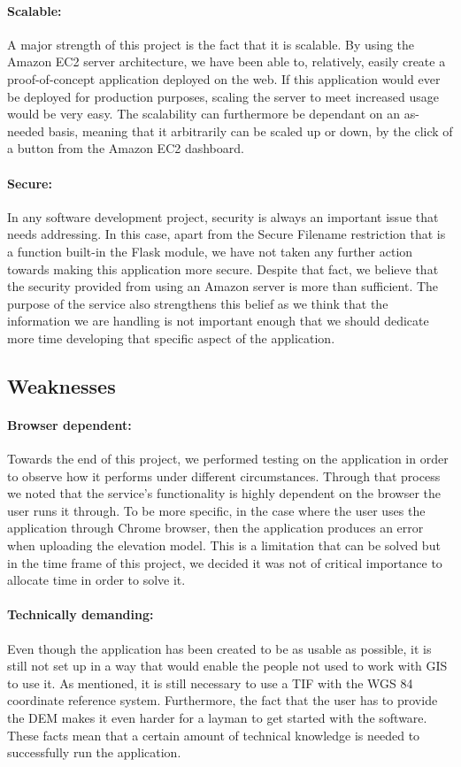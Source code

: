 \paragraph{Scalable:} A major strength of this project is the fact that it is scalable. By using the Amazon EC2 server architecture, we have been able to, relatively, easily create a proof-of-concept application deployed on the web. If this application would ever be deployed for production purposes, scaling the server to meet increased usage would be very easy. The scalability can furthermore be dependant on an as-needed basis, meaning that it arbitrarily can be scaled up or down, by the click of a button from the Amazon EC2 dashboard.

\paragraph{Secure:} In any software development project, security is always an important issue that needs addressing. In this case, apart from the Secure Filename restriction that is a function built-in the Flask module, we have not taken any further action towards making this application more secure. Despite that fact, we believe that the security provided from using an Amazon server is more than sufficient.  The purpose of the service also strengthens this belief as we think that the information we are handling is not important enough that we should dedicate more time developing that specific aspect of the application.

\subsection{Weaknesses}
\paragraph{Browser dependent:} Towards the end of this project, we performed testing on the application in order to observe how it performs under different circumstances. Through that process we noted that the service's functionality is highly dependent on the browser the user runs it through. To be more specific, in the case where the user uses the application through Chrome browser, then the application produces an error when uploading the elevation model. This is a limitation that can be solved but in the time frame of this project, we decided it was not of critical importance to allocate time in order to solve it.

\paragraph{Technically demanding:} Even though the application has been created to be as usable as possible, it is still not set up in a way that would enable the people not used to work with GIS to use it. As mentioned, it is still necessary to use a TIF with the WGS 84 coordinate reference system. Furthermore, the fact that the user has to provide the DEM makes it even harder for a layman to get started with the software.  These facts mean that a certain amount of technical knowledge is needed to successfully run the application.


